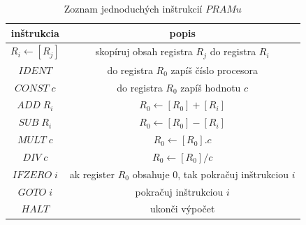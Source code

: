 \begin{table}[!ht]\label{pram_tab_pram}
 \begin{center}
  \begin{tabular}{|c||c|}
   \hline
   inštrukcia & popis \\  \hline  \hline
   $R_i\leftarrow [R_j]$ & skopíruj obsah registra $R_j$ do registra $R_i$
   \\ \hline
   $IDENT$ & do registra $R_0$ zapíš číslo procesora \\ \hline
   $CONST\; c$ & do registra $R_0$ zapíš hodnotu $c$ \\ \hline
   $ADD\; R_i$ & $R_0\leftarrow [R_0]+[R_i]$ \\ \hline
   $SUB\; R_i$ & $R_0\leftarrow [R_0]-[R_i]$ \\ \hline
   $MULT\; c$ & $R_0\leftarrow [R_0].c$ \\ \hline
   $DIV\; c$ & $R_0\leftarrow [R_0]/c$ \\ \hline
   $IFZERO\; i$ & ak register $R_0$ obsahuje 0, tak pokračuj
   inštrukciou $i$ \\ \hline
   $GOTO\; i$ & pokračuj inštrukciou $i$ \\ \hline
   $HALT$ & ukonči výpočet \\ \hline
  \end{tabular}
 \end{center}
\caption{Zoznam jednoduchých inštrukcií $PRAMu$}
\end{table}

\smallskip

